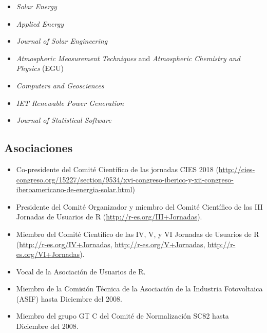 \documentclass[article, a4paper]{memoir}
\begin{document}
\begin{itemize}
\item \emph{Solar Energy}

\item \emph{Applied Energy}

\item \emph{Journal of Solar Engineering}

\item \emph{Atmospheric Measurement Techniques} and \emph{Atmospheric Chemistry and Physics} (EGU)

\item \emph{Computers and Geosciences}

\item \emph{IET Renewable Power Generation}

\item \emph{Journal of Statistical Software}
\end{itemize}

\subsection{Asociaciones}
\label{sec:org29052a9}

\begin{itemize}
\item Co-presidente del Comité Científico de las jornadas CIES 2018 (\url{http://cies-congreso.org/15227/section/9534/xvi-congreso-iberico-y-xii-congreso-iberoamericano-de-energia-solar.html})

\item Presidente del Comité Organizador y miembro del Comité Científico de las III Jornadas de Usuarios de R (\url{http://r-es.org/III+Jornadas}).

\item Miembro del Comité Científico de las IV, V, y VI Jornadas de Usuarios de R (\url{http://r-es.org/IV+Jornadas}, \url{http://r-es.org/V+Jornadas}, \url{http://r-es.org/VI+Jornadas}).

\item Vocal de la Asociación de Usuarios de R.

\item Miembro de la Comisión Técnica de la Asociación de la Industria Fotovoltaica (ASIF) hasta Diciembre del 2008.

\item Miembro del grupo GT C del Comité de Normalización SC82 hasta Diciembre del 2008.
\end{itemize}
\end{document}
